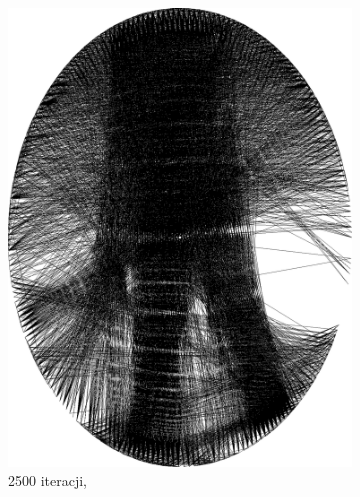 \begin{figure}[H]
\begin{subfigure}{0.19\textwidth}
            \includegraphics[width = \textwidth]{img/2-theory/aldrin/030mask-aldrin_ellipse_2500_threaded.png}
            \caption{2500 iteracji, }
            \label{theory-technics-mask-aldrin-threaded-m}
        \end{subfigure}
        \begin{subfigure}{0.19\textwidth}
            \centering

\end{subfigure}
\end{figure}
